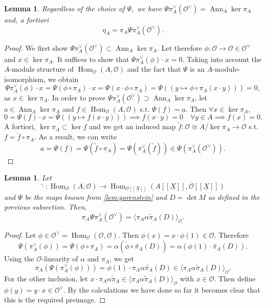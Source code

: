 \documentclass{article}
\theoremstyle{plain}%
\newtheorem{lemma}[theorem]{Lemma}
\theoremstyle{definition}
\theoremstyle{remark}
\newcommand{\ann}{\operatorname{Ann}}
\renewcommand{\hom}{\operatorname{Hom}}
\begin{document}
\begin{lemma}
    Regardless of the choice of \(\Psi,\) we have 
    \(\Psi \pi_A^\vee(\mathcal{O}^\vee) = \ann_A \ker \pi_A\) and, a fortiori
    \[
        \eta_A = \pi_A \Psi \pi_A^\vee(\mathcal{O}^\vee).  
    \]
\end{lemma}
\begin{proof}
    We first show \(\Psi \pi_A^\vee(\mathcal{O}^\vee) \subset \ann_A \ker \pi_A\).
    Let therefore \(\phi\colon \mathcal{O} \to \mathcal{O} \in \mathcal{O}^\vee\) and \(x \in \ker \pi_A\).
    It suffices to show that \(\Psi \pi_A^\vee(\phi) \cdot x = 0\).
    Taking into account the \(A\)-module structure of \(\hom_\mathcal{O}(A, \mathcal{O})\) 
    and the fact that \(\Psi\) is an \(A\)-module-isomorphism, we obtain
    \[
        \Psi \pi_A^\vee(\phi) \cdot x = \Psi(\phi \circ \pi_A) \cdot x = \Psi(x \cdot \phi \circ \pi_A) 
        = \Psi((y \mapsto \phi \circ \pi_A(x\cdot y))) = 0,
    \]
    as \(x \in \ker \pi_A\).
    In order to prove  \(\Psi \pi_A^\vee(\mathcal{O}^\vee) \supset \ann_A \ker \pi_A\), let \(a \in \ann_A \ker \pi_A\)
    and \(f \in \hom_\mathcal{O}(A, \mathcal{O})\) s.t. \(\Psi(f) = a\). Then \(\forall x \in \ker \pi_A\),
    \[
        0 = \Psi(f) \cdot x = \Psi((y \mapsto f(x\cdot y))) \implies f(x\cdot y) = 0\quad \forall y \in A \implies f(x) = 0.
    \]
    A fortiori, \(\ker \pi_A \subset \ker f\) and we get an induced map \(\tilde f\colon \mathcal{O} \cong A/\ker \pi_A \to \mathcal{O}\)
    s.t. \(f = \tilde f \circ \pi_A\). As a result, we can write
    \[
        a = \Psi(f) = \Psi(\tilde f \circ \pi_A) = \Psi(\pi_A^\vee(\tilde f)) \in \Psi(\pi_A^\vee(\mathcal{O}^\vee)).  
    \]
\end{proof}

\begin{lemma}
    Let 
    \[
        \!\tilde{\cdot}\colon \hom_\mathcal{O}(A, \mathcal{O}) \to 
        \hom_{\mathcal{O}[[\underline{X}]]}(A[[\underline{X}]], \mathcal{O}[[\underline{X}]])
    \]
    and \(\Psi\)
    be the maps known from \cref{lem:gorenstein} and \(D = \det M\) as defined in the previous subsection.
    Then,
    \[
        \pi_A \Psi \pi_A^\vee(\mathcal{O}^\vee) = \langle\pi_A\alpha \tilde \pi_A(D)\rangle_\mathcal{O}.
    \]
\end{lemma}
\begin{proof}
    Let \(\phi \in \mathcal{O}^\vee = \hom_\mathcal{O}(\mathcal{O}, \mathcal{O})\).
    Then \(\phi(x) = x \cdot\phi(1) \in \mathcal{O}\). Therefore 
    \[
        \Psi(\pi_A^\vee(\phi)) = \Psi(\phi \circ \pi_A) = \alpha(\tilde{\phi} \circ \tilde{\pi_A}(D)) = \alpha(\phi(1)\cdot \tilde{\pi_A}(D)).
    \]
    Using the \(\mathcal{O}\)-linearity of \(\alpha\) and \(\pi_A\), we get
    \[
        \pi_A(\Psi(\pi_A^\vee(\phi))) = \phi(1) \cdot \pi_A \alpha \tilde{\pi_A}(D) \in \langle\pi_A\alpha \tilde \pi_A(D)\rangle_\mathcal{O}.
    \]
    For the other inclusion, let \(x\cdot \pi_A\alpha\tilde \pi_A \in \langle\pi_A\alpha \tilde \pi_A(D)\rangle_\mathcal{O}\) 
    with \(x \in \mathcal{O}\). Then define \(\phi(y) = y \cdot x \in \mathcal{O}^\vee\).
    By the calculations we have done so far it becomes clear that this is the required preimage.
\end{proof}
\end{document}
